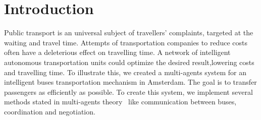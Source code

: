 \section{Introduction}

Public transport is an universal subject of travellers' complaints, targeted at the waiting and travel time. Attempts of transportation companies to reduce costs often have a deleterious effect on travelling time. A network of intelligent autonomous transportation units could optimize the desired result,lowering costs and travelling time. To illustrate this, we created a multi-agents system for an intelligent buses transportation mechanism in Amsterdam. The goal is to transfer passengers as efficiently as possible. To create this system, we implement several methods stated in multi-agents theory~\cite{intromultiagentsystems} like communication between buses, coordination and negotiation. 
